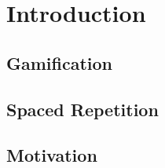 
\chapter{Introduction} %

\label{intro} %


\section{Gamification}

\section{Spaced Repetition}

\section{Motivation}

